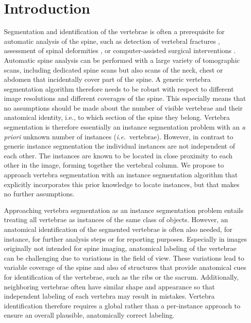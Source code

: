 \documentclass[authoryear,5p,final,times]{elsarticle}
\begin{document}
\begin{frontmatter}
\begin{abstract}
        \end{abstract}
    \end{frontmatter}
        
    \section{Introduction}
    
    Segmentation and identification of the vertebrae is often a prerequisite for automatic analysis of the spine, such as detection of vertebral fractures \citep{Yao2012}, assessment of spinal deformities \citep{Forsberg2013}, or computer-assisted surgical interventions \citep{Knez2016}. Automatic spine analysis can be performed with a large variety of tomographic scans, including dedicated spine scans but also scans of the neck, chest or abdomen that incidentally cover part of the spine. A generic vertebra segmentation algorithm therefore needs to be robust with respect to different image resolutions and different coverages of the spine. This especially means that no assumptions should be made about the number of visible vertebrae and their anatomical identity, i.e., to which section of the spine they belong. Vertebra segmentation is therefore essentially an instance segmentation problem with an \emph{a priori} unknown number of instances (\emph{i.e.\ }vertebrae). However, in contrast to generic instance segmentation the individual instances are not independent of each other. The instances are known to be located in close proximity to each other in the image, forming together the vertebral column. We propose to approach vertebra segmentation with an instance segmentation algorithm that explicitly incorporates this prior knowledge to locate instances, but that makes no further assumptions.
    
    Approaching vertebra segmentation as an instance segmentation problem entails treating all vertebrae as instances of the same class of objects. However, an anatomical identification of the segmented vertebrae is often also needed, for instance, for further analysis steps or for reporting purposes. Especially in images originally not intended for spine imaging, anatomical labeling of the vertebrae can be challenging due to variations in the field of view. These variations lead to variable coverage of the spine and also of structures that provide anatomical cues for identification of the vertebrae, such as the ribs or the sacrum. Additionally, neighboring vertebrae often have similar shape and appearance so that independent labeling of each vertebra may result in mistakes. Vertebra identification therefore requires a global rather than a per-instance approach to ensure an overall plausible, anatomically correct labeling.
        
\end{document}
